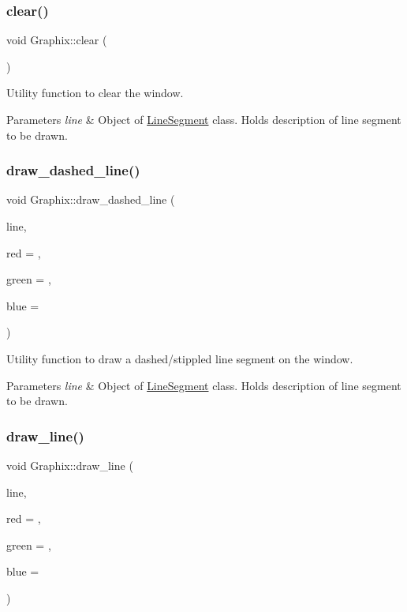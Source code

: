\subsubsection{\texorpdfstring{clear()}{clear()}}
{\footnotesize\ttfamily void Graphix\+::clear (\begin{DoxyParamCaption}{ }\end{DoxyParamCaption})}

Utility function to clear the window. 
\begin{DoxyParams}{Parameters}
{\em line} & Object of \hyperlink{classLineSegment}{Line\+Segment} class. Holds description of line segment to be drawn. \\
\hline
\end{DoxyParams}
\mbox{\label{classGraphix_a9a1ebf0c6d508ce4686b9794c4dec871}} 
\subsubsection{\texorpdfstring{draw\+\_\+dashed\+\_\+line()}{draw\_dashed\_line()}}
{\footnotesize\ttfamily void Graphix\+::draw\+\_\+dashed\+\_\+line (\begin{DoxyParamCaption}\item[{\hyperlink{classLineSegment}{Line\+Segment}}]{line,  }\item[{G\+Lfloat}]{red = {},  }\item[{G\+Lfloat}]{green = {},  }\item[{G\+Lfloat}]{blue = {} }\end{DoxyParamCaption})}

Utility function to draw a dashed/stippled line segment on the window. 
\begin{DoxyParams}{Parameters}
{\em line} & Object of \hyperlink{classLineSegment}{Line\+Segment} class. Holds description of line segment to be drawn. \\
\hline
\end{DoxyParams}
\mbox{\label{classGraphix_a74af1cd957a0fc3b5e0ee1f951a994e1}} 
\subsubsection{\texorpdfstring{draw\+\_\+line()}{draw\_line()}}
{\footnotesize\ttfamily void Graphix\+::draw\+\_\+line (\begin{DoxyParamCaption}\item[{\hyperlink{classLineSegment}{Line\+Segment}}]{line,  }\item[{G\+Lfloat}]{red = {},  }\item[{G\+Lfloat}]{green = {},  }\item[{G\+Lfloat}]{blue = {} }\end{DoxyParamCaption})}

